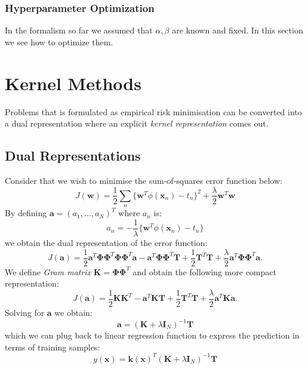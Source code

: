 \documentclass[a4paper]{article}
\newcommand{\mb}{\mathbf}
\begin{document}
\subsubsection{Hyperparameter Optimization}
In the formalism so far we assumed that $\alpha, \beta$ are known and fixed. In this section we see how to optimize them. 


\clearpage
\newpage

\section{Kernel Methods}
Problems that is formulated as empirical risk minimisation can be converted into a dual representation where an explicit \textit{kernel representation} comes out. 

\subsection{Dual Representations}

Consider that we wish to minimise the sum-of-squares error function below:
%
\begin{equation}
J(\mb{w}) = \frac{1}{2}\sum\limits_{n}\{\mb{w}^T\phi(\mb{x}_n)-t_n\}^2+\frac{\lambda}{2}\mb{w}^T\mb{w}
\end{equation}
%
By defining $\mb{a}=(a_1,\hdots,a_N)^T$ where $a_n$ is:
%
\begin{equation}
a_n=-\frac{1}{\lambda}\{\mb{w}^T \phi(\mb{x}_n)-t_n\}
\end{equation}
%
we obtain the dual representation of the error function:
%
\begin{equation}
J(\mb{a})=\frac{1}{2}\mb{a}^T\mb{\Phi\Phi}^T\mb{\Phi\Phi}^T\mb{a}-\mb{a}^T\mb{\Phi\Phi}^T\mb{T}+\frac{1}{2}\mb{T}^T\mb{T}+\frac{\lambda}{2}\mb{a}^T\mb{\Phi\Phi}^T\mb{a}.
\end{equation}
%
%
We define \textit{Gram matrix} $\mb{K}=\mb{\Phi\Phi}^T$ and obtain the following more compact representation:
%
%
\begin{equation}
J(\mb{a}) = \frac{1}{2}\mb{KK}^T-\mb{a}^T\mb{K}\mb{T}+\frac{1}{2}\mb{T}^T\mb{T}+\frac{\lambda}{2}\mb{a}^T\mb{Ka}.
\end{equation}
Solving for $\mb{a}$ we obtain:
%
\begin{equation}
\mb{a} = (\mb{K}+\lambda\mb{I}_N)^{-1}\mb{T}
\end{equation}
which we can plug back to linear regression function to express the prediction in terms of training samples:
%
\begin{equation}
y(\mb{x})= \mb{k}(\mb{x})^T(\mb{K}+\lambda\mb{I}_N)^{-1}\mb{T}
\end{equation}
\end{document}
